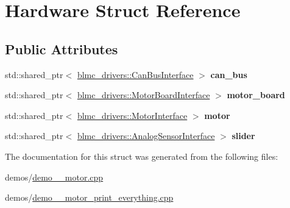 \hypertarget{structHardware}{}\section{Hardware Struct Reference}
\label{structHardware}
\subsection*{Public Attributes}
\begin{DoxyCompactItemize}
\item 
\mbox{\label{structHardware_af6014d03d5d50bacf8c96e841cf8184d}} 
std\+::shared\+\_\+ptr$<$ \hyperlink{classblmc__drivers_1_1CanBusInterface}{blmc\+\_\+drivers\+::\+Can\+Bus\+Interface} $>$ {\bfseries can\+\_\+bus}
\item 
\mbox{\label{structHardware_a6882a74056ffaa2a946b0f9b98d00b02}} 
std\+::shared\+\_\+ptr$<$ \hyperlink{classblmc__drivers_1_1MotorBoardInterface}{blmc\+\_\+drivers\+::\+Motor\+Board\+Interface} $>$ {\bfseries motor\+\_\+board}
\item 
\mbox{\label{structHardware_a78675cea76da541862144708a3996dcc}} 
std\+::shared\+\_\+ptr$<$ \hyperlink{classblmc__drivers_1_1MotorInterface}{blmc\+\_\+drivers\+::\+Motor\+Interface} $>$ {\bfseries motor}
\item 
\mbox{\label{structHardware_ac10da22a00e796b078624795da7e835d}} 
std\+::shared\+\_\+ptr$<$ \hyperlink{classblmc__drivers_1_1AnalogSensorInterface}{blmc\+\_\+drivers\+::\+Analog\+Sensor\+Interface} $>$ {\bfseries slider}
\end{DoxyCompactItemize}


The documentation for this struct was generated from the following files\+:\begin{DoxyCompactItemize}
\item 
demos/\hyperlink{demo__1__motor_8cpp}{demo\+\_\+\_\+motor.\+cpp}\item 
demos/\hyperlink{demo__1__motor__print__everything_8cpp}{demo\+\_\+\_\+motor\+\_\+print\+\_\+everything.\+cpp}\end{DoxyCompactItemize}
